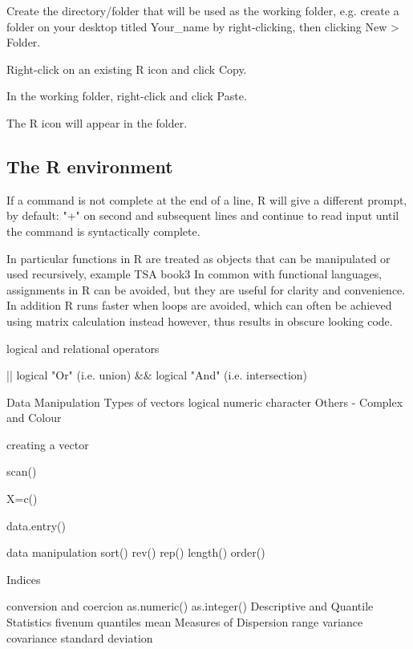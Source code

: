 Create the directory/folder that will be used as the working folder, e.g. create a folder on your desktop titled Your_name by right-clicking, then clicking New > Folder.

Right-click on an existing R icon and click Copy. 

In the working folder, right-click and click Paste. 

The R icon will appear in the folder.



\subsection*{The R environment}

 
 
If a command is not complete at the end of a line, R will give a different prompt, by default:
"+" on second and subsequent lines and continue to read input until the command is syntactically complete.
 
In particular functions in R are treated as objects that can be manipulated or used recursively, example TSA book3
In common with functional languages, assignments in R can be avoided, but they are useful for clarity and convenience. 
In addition R runs faster when loops are avoided, which can often be achieved using matrix calculation instead however, thus results in obscure looking code.
 



logical and relational operators
 
||      logical "Or"      (i.e.  union)
&&     logical "And"   (i.e. intersection)   

 



Data Manipulation
Types of vectors
	logical
	numeric
	character
    Others  - Complex and Colour

creating a vector

scan()

X=c()

data.entry()

data manipulation
sort()
rev()
rep()
length()
order()


Indices

 

 

 
conversion and coercion
as.numeric()
as.integer()
Descriptive and Quantile Statistics
fivenum
quantiles
mean
Measures of Dispersion
  range
  variance
  covariance
  standard deviation

